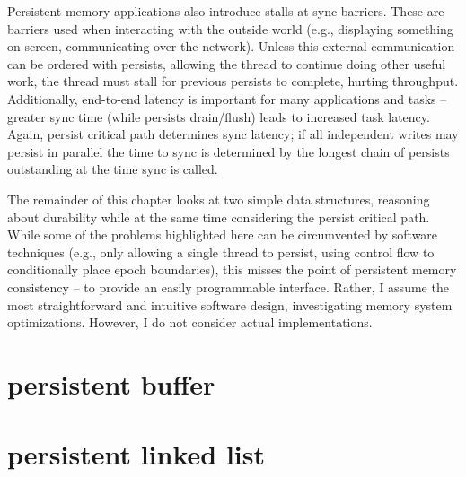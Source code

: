 Persistent memory applications also introduce stalls at sync barriers.
These are barriers used when interacting with the outside world (e.g., displaying something on-screen, communicating over the network).
Unless this external communication can be ordered with persists, allowing the thread to continue doing other useful work, the thread must stall for previous persists to complete, hurting throughput.
Additionally, end-to-end latency is important for many applications and tasks -- greater sync time (while persists drain/flush) leads to increased task latency.
Again, persist critical path determines sync latency; if all independent writes may persist in parallel the time to sync is determined by the longest chain of persists outstanding at the time sync is called.

The remainder of this chapter looks at two simple data structures, reasoning about durability while at the same time considering the persist critical path.
While some of the problems highlighted here can be circumvented by software techniques (e.g., only allowing a single thread to persist, using control flow to conditionally place epoch boundaries), this misses the point of persistent memory consistency -- to provide an easily programmable interface.
Rather, I assume the most straightforward and intuitive software design, investigating memory system optimizations.
However, I do not consider actual implementations.

\section{persistent buffer}
\label{sec:PMC_patterns:Buffer}





\section{persistent linked list}
\label{sec:PMC_patterns:LinkedList}


